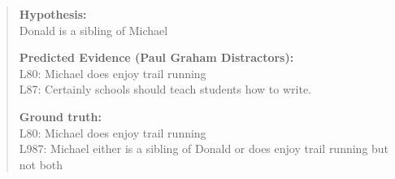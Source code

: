 \documentclass[11pt]{article}
\newenvironment{example}{%
    \vspace{0.5em}
    \begin{quotation}
}{%
    \end{quotation}
    \vspace{0.5em}
}
\begin{document}
\begin{example}
\textbf{Hypothesis:}\\ Donald is a sibling of Michael

\textbf{Predicted Evidence (Paul Graham Distractors):}\\
L80: Michael does enjoy trail running\\
L87: Certainly schools should teach students how to write.

\textbf{Ground truth:}\\
L80: Michael does enjoy trail running\\
L987: Michael either is a sibling of Donald or does enjoy trail running but not both
\end{example}
\end{document}
